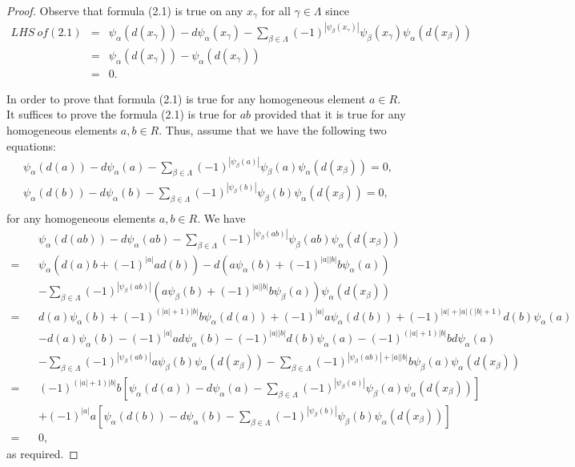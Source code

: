 \documentclass[a4paper,10pt]{amsart}
\theoremstyle{definition}
\theoremstyle{remark}
\numberwithin{equation}{section}
\begin{document}
\begin{proof}
Observe that formula (2.1) is true on any $x_{\gamma}$ for all
$\gamma\in \Lambda$ since
\begin{eqnarray*}
LHS ~of (2.1)
&=&\psi_{\alpha}(d(x_{\gamma}))-d\psi_{\alpha}(x_{\gamma})-\sum_{\beta\in
\Lambda}(-1)^{|\psi_{\beta}(x_{\gamma})|}\psi_{\beta}(x_{\gamma})\psi_{\alpha}(d(x_{\beta}))\\
&=&\psi_{\alpha}(d(x_{\gamma}))-\psi_{\alpha}(d(x_{\gamma}))\\
&=&0.
\end{eqnarray*}

In order to prove that formula (2.1) is true for any homogeneous
element $a\in R$. It suffices to prove the formula (2.1) is true for
$ab$ provided that it is true for any homogeneous elements $a, b\in
R$. Thus, assume that we have the following two equations:
\begin{eqnarray*}
\psi_{\alpha}(d(a))-d\psi_{\alpha}(a)-\sum_{\beta\in
\Lambda}(-1)^{|\psi_{\beta}(a)|}\psi_{\beta}(a)\psi_{\alpha}(d(x_{\beta}))=0,\\
\psi_{\alpha}(d(b))-d\psi_{\alpha}(b)-\sum_{\beta\in
\Lambda}(-1)^{|\psi_{\beta}(b)|}\psi_{\beta}(b)\psi_{\alpha}(d(x_{\beta}))=0,\\
\end{eqnarray*}
for any homogeneous elements $a, b\in R$. We have
\begin{equation}
\begin{split}
&\psi_{\alpha}(d(ab))-d\psi_{\alpha}(ab)-\sum_{\beta\in
\Lambda}(-1)^{|\psi_{\beta}(ab)|}\psi_{\beta}(ab)\psi_{\alpha}(d(x_{\beta}))\\
=~~~~&\psi_{\alpha}(d(a)b+(-1)^{|a|}ad(b))-d(a\psi_{\alpha}(b)+(-1)^{|a||b|}b\psi_{\alpha}(a))\\
&-\sum_{\beta\in \Lambda}(-1)^{|\psi_{\beta}(ab)|}(a\psi_{\beta}(b)+(-1)^{|a||b|}b\psi_{\beta}(a))\psi_{\alpha}(d(x_{\beta}))\\
=~~~~&d(a)\psi_{\alpha}(b)+(-1)^{(|a|+1)|b|}b\psi_{\alpha}(d(a))+(-1)^{|a|}a\psi_{\alpha}(d(b))+(-1)^{|a|+|a|(|b|+1)}d(b)\psi_{\alpha}(a)\\
&-d(a)\psi_{\alpha}(b)-(-1)^{|a|}ad\psi_{\alpha}(b)-(-1)^{|a||b|}d(b)\psi_{\alpha}(a)-(-1)^{(|a|+1)|b|}bd\psi_{\alpha}(a)\\
&-\sum_{\beta\in
\Lambda}(-1)^{|\psi_{\beta}(ab)|}a\psi_{\beta}(b)\psi_{\alpha}(d(x_{\beta}))-\sum_{\beta\in
\Lambda}(-1)^{|\psi_{\beta}(ab)|+|a||b|}
b\psi_{\beta}(a)\psi_{\alpha}(d(x_{\beta}))\\
=~~~~&(-1)^{(|a|+1)|b|}b[\psi_{\alpha}(d(a))-d\psi_{\alpha}(a)-\sum_{\beta\in
\Lambda}(-1)^{|\psi_{\beta}(a)|}\psi_{\beta}(a)\psi_{\alpha}(d(x_{\beta}))]\\
&+(-1)^{|a|}a[\psi_{\alpha}(d(b))-d\psi_{\alpha}(b)-\sum_{\beta\in \Lambda}
(-1)^{|\psi_{\beta}(b)|}\psi_{\beta}(b)\psi_{\alpha}(d(x_{\beta}))]\\
=~~~~&0,
\end{split}\nonumber
\end{equation}
as required.
\end{proof}
\end{document}

